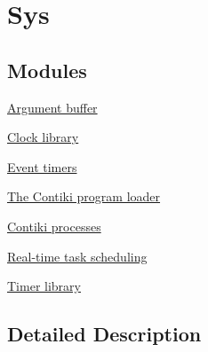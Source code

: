 \hypertarget{group__sys}{\section{Sys}
\label{group__sys}
}
\subsection*{Modules}
\begin{DoxyCompactItemize}
\item 
\hyperlink{group__arg}{Argument buffer}
\item 
\hyperlink{group__clock}{Clock library}
\item 
\hyperlink{group__etimer}{Event timers}
\item 
\hyperlink{group__loader}{The Contiki program loader}
\item 
\hyperlink{group__process}{Contiki processes}
\item 
\hyperlink{group__rt}{Real-\/time task scheduling}
\item 
\hyperlink{group__timer}{Timer library}
\end{DoxyCompactItemize}


\subsection{Detailed Description}

